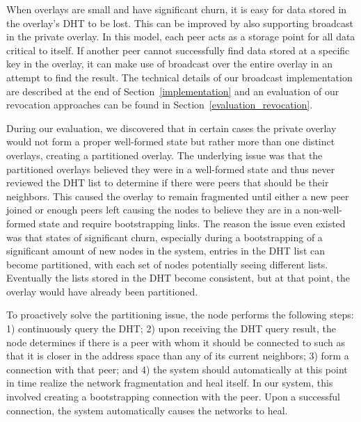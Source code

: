 \documentclass[conference]{IEEEtran}
\begin{document}

When overlays are small and have significant churn, it is easy for data stored
in the overlay's DHT to be lost.  This can be improved by also supporting
broadcast in the private overlay.  In this model, each peer acts as a
storage point for all data critical to itself.  If another peer cannot
successfully find data stored at a specific key in the overlay, it can make
use of broadcast over the entire overlay in an attempt to find
the result.  The technical details of our broadcast implementation are described
at the end of Section~\ref{implementation} and an evaluation of our revocation
approaches can be found in Section~\ref{evaluation_revocation}.

During our evaluation, we discovered that in certain cases the private overlay
would not form a proper well-formed state but rather more than one distinct
overlays, creating a partitioned overlay.  The underlying issue was that the
partitioned overlays believed they were in a well-formed state and thus never
reviewed the DHT list to determine if there were peers that should be their
neighbors.  This caused the overlay to remain fragmented until either a new
peer joined or enough peers left causing the nodes to believe they are in a
non-well-formed state and require bootstrapping links.
The reason the issue even existed was that states of significant churn,
especially during a bootstrapping of a significant amount of new nodes in the
system, entries in the DHT list can become partitioned, with each set of nodes potentially
seeing different lists.  Eventually the lists stored in the DHT become consistent,
but at that point, the overlay would have already been partitioned.

To proactively solve the partitioning issue, the node performs the following
steps: 1) continuously query the DHT;  2) upon receiving the DHT query result,
the node determines if there is a peer with whom it should be connected to
such as that it is closer in the address space than any of its current neighbors;
3) form a connection with that peer; and 4) the system should automatically at
this point in time realize the network fragmentation and heal itself.  In our
system, this involved creating a bootstrapping connection with the peer.  Upon
a successful connection, the system automatically causes the networks to heal.
\end{document}
